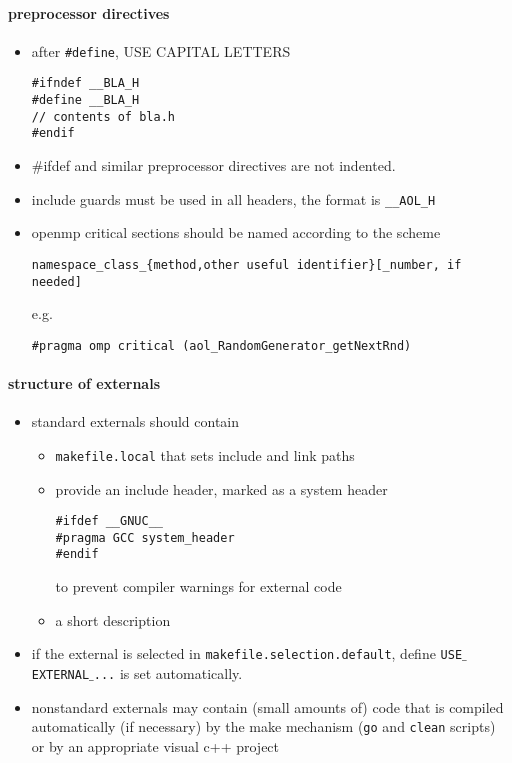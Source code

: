 \paragraph{preprocessor directives}

\begin{itemize}
    \item after \verb|#define|, USE CAPITAL LETTERS
          \begin{verbatim}
#ifndef __BLA_H
#define __BLA_H
// contents of bla.h
#endif         \end{verbatim}
    \item \#ifdef and similar preprocessor directives are not indented.
    \item include guards must be used in all headers, the format is \verb|__AOL_H|
    \item openmp critical sections should be named according to the scheme
\begin{verbatim}
namespace_class_{method,other useful identifier}[_number, if needed]
\end{verbatim}
      e.g.
\begin{verbatim}
#pragma omp critical (aol_RandomGenerator_getNextRnd)
\end{verbatim}
\end{itemize}


\paragraph{structure of externals}

\begin{itemize}
\item standard externals should contain
  \begin{itemize}
  \item \texttt{makefile.local} that sets include and link paths
  \item provide an include header, marked as a system header
\begin{verbatim}
#ifdef __GNUC__
#pragma GCC system_header
#endif
\end{verbatim}
    to prevent compiler warnings for external code
  \item a short description
  \end{itemize}
\item if the external is selected in
  \texttt{makefile.selection.default}, define
  \texttt{USE$\_$EXTERNAL$\_$...} is set automatically.
\item nonstandard externals may contain (small amounts of) code that
  is compiled automatically (if necessary) by the make mechanism
  (\texttt{go} and \texttt{clean} scripts) or by an appropriate visual
  c++ project
\end{itemize}


